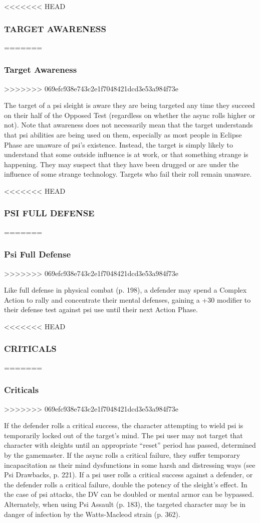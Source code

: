 <<<<<<< HEAD
\subsubsection{TARGET AWARENESS}
=======
\subsubsection{Target Awareness}
>>>>>>> 069efc938e743c2e1f7048421dcd3e53a984f73e

The target of a psi sleight is aware they are being
targeted any time they succeed on their half of the
Opposed Test (regardless on whether the async
rolls higher or not). Note that awareness does not
necessarily mean that the target understands that psi
abilities are being used on them, especially as most
people in Eclipse Phase are unaware of psi’s existence.
Instead, the target is simply likely to understand that
some outside influence is at work, or that something
strange is happening. They may suspect that they
have been drugged or are under the influence of some
strange technology.
Targets who fail their roll remain unaware.

<<<<<<< HEAD
\subsubsection{PSI FULL DEFENSE}
=======
\subsubsection{Psi Full Defense}
>>>>>>> 069efc938e743c2e1f7048421dcd3e53a984f73e

Like full defense in physical combat (p. 198), a defender
may spend a Complex Action to rally and concentrate
their mental defenses, gaining a +30 modifier
to their defense test against psi use until their next
Action Phase.

<<<<<<< HEAD
\subsubsection{CRITICALS}
=======
\subsubsection{Criticals}
>>>>>>> 069efc938e743c2e1f7048421dcd3e53a984f73e

If the defender rolls a critical success, the character
attempting to wield psi is temporarily locked out of
the target’s mind. The psi user may not target that
character with sleights until an appropriate “reset”
period has passed, determined by the gamemaster.
If the async rolls a critical failure, they suffer temporary
incapacitation as their mind dysfunctions in some
harsh and distressing ways (see Psi Drawbacks, p. 221).
If a psi user rolls a critical success against a defender,
or the defender rolls a critical failure, double
the potency of the sleight’s effect. In the case of psi attacks,
the DV can be doubled or mental armor can be
bypassed. Alternately, when using Psi Assault (p. 183),
the targeted character may be in danger of infection
by the Watts-Macleod strain (p. 362).

